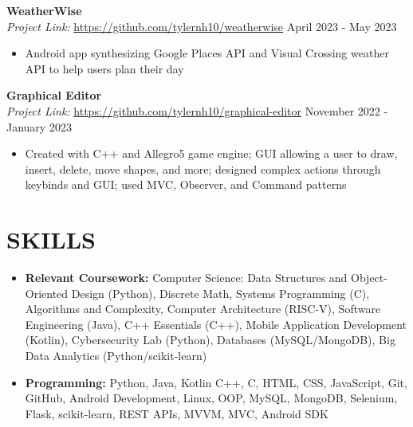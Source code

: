 \documentclass[a4paper,10pt]{extarticle}
\begin{document}
\noindent
\textbf{WeatherWise}\\ %
\textit{Project Link:} \url{https://github.com/tylernh10/weatherwise} \hfill April 2023 - May 2023 %
\begin{itemize}[topsep=3pt]
    \item Android app synthesizing Google Places API and Visual Crossing weather API to help users plan their day %
\end{itemize}

\noindent
\textbf{Graphical Editor}\\ %
\textit{Project Link:} \url{https://github.com/tylernh10/graphical-editor} \hfill November 2022 - January 2023 %
\begin{itemize}[topsep=3pt]
    \item Created with C++ and Allegro5 game engine; GUI allowing a user to draw, insert, delete, move shapes, and more; designed complex actions through keybinds and  GUI; used MVC, Observer, and Command patterns %
\end{itemize}

\section*{SKILLS}
\begin{itemize}
    \item \textbf{Relevant Coursework:} Computer Science: Data Structures and Object-Oriented Design (Python), Discrete Math, Systems Programming (C), Algorithms and Complexity, Computer Architecture (RISC-V), Software Engineering (Java), C++ Essentials (C++), Mobile Application Development (Kotlin), Cybersecurity Lab (Python), Databases (MySQL/MongoDB), Big Data Analytics (Python/scikit-learn) %
    \item \textbf{Programming:} Python, Java, Kotlin C++, C, HTML, CSS, JavaScript, Git, GitHub, Android Development, Linux, OOP, MySQL, MongoDB, Selenium, Flask, scikit-learn, REST APIs, MVVM, MVC, Android SDK %
\end{itemize}

\end{document}
